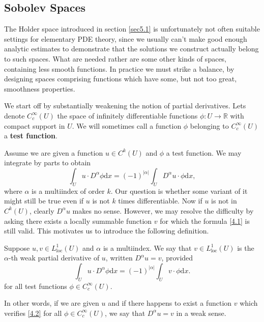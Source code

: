 \subsection{Sobolev Spaces}
The Holder space introduced in section \ref{sec5.1} is unfortunately not often suitable settings for elementary PDE theory, since we usually can't make good enough analytic estimates to demonstrate that the solutions we construct actually belong to such spaces. What are needed rather are some other kinds of spaces, containing less smooth functions. In practice we must strike a balance, by designing spaces comprising functions which have some, but not too great, smoothness properties.\par
We start off by substantially weakening the notion of partial derivatives. Lets denote $C_c^\infty(U)$ the space of infinitely differentiable functions $\phi:U\to\mathbb{R}$ with compact support in $U$. We will sometimes call a function $\phi$ belonging to $C_c^\infty(U)$ a \textbf{test function}.\par
Assume we are given a function $u\in C^k(U)$ and $\phi$ a test function. We may integrate by parts to obtain 
\begin{equation}\label{4.1}
\int_U{u\cdot D^{\alpha}\phi \mathrm{d}x}=\left( -1 \right) ^{\left| \alpha \right|}\int_U{D^{\alpha}u\cdot \phi \mathrm{d}x},
\end{equation}
where $\alpha$ is a multiindex of order $k$. Our question is whether some variant of it might still be true even if $u$ is not $k$ times differentiable. Now if $u$ is not in $C^k(U)$, clearly $D^\alpha u$ makes no sense. However, we may resolve the difficulty by asking there exists a locally summable function $v$ for which the formula \eqref{4.1} is still valid. This motivates us to introduce the following definition.
\begin{definition}
Suppose $u,v\in L_{\mathrm{loc}}^1(U)$ and $\alpha$ is a multiindex. We say that $v\in L_{\mathrm{loc}}^1(U)$ is the $\alpha$-th weak partial derivative of $u$, written $D^\alpha u=v$, provided 
\begin{equation}\label{4.2}
\int_U{u\cdot D^{\alpha}\phi \mathrm{d}x}=\left( -1 \right) ^{\left| \alpha \right|}\int_U{v\cdot \phi \mathrm{d}x}.
\end{equation}
for all test functions $\phi\in C_c^\infty(U)$.
\end{definition}
In other words, if we are given $u$ and if there happens to exist a function $v$ which verifies \eqref{4.2} for all $\phi\in C_c^\infty(U)$, we say that $D^\alpha u=v$ in a weak sense.
